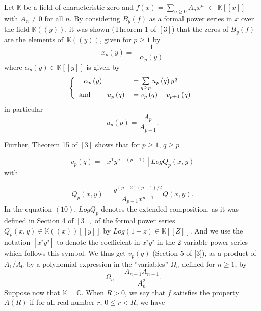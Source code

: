 \documentclass{article}
\begin{document}
Let $\mathbb{K}$ be a field of characteristic zero and $f\left( x\right)
=\sum_{n\geq 0}A_{n}x^{n}$ $\in $ $\mathbb{K}\left[ \left[ x\right] \right] $
with $A_{n}\neq 0$ for all $n$. By considering $B_{y}\left( f\right) $ as a
formal power series in $x$ over the field $\mathbb{K}\left( \left( y\right)
\right) $, it was shown (Theorem 1 of $\left[ 3\right] $) that the zeros of $B_{y}\left( f\right) $ are the elements of\ $\mathbb{K}\left( \left(
y\right) \right) $, given for $p\geq 1$ by 
\begin{equation}
x_{p}\left( y\right) =-\dfrac{1}{\alpha _{p}\left( y\right) }
\end{equation}
where $\alpha _{p}\left( y\right) \in \mathbb{K}\left[ \left[ y\right] \right] $ is given by 
\begin{equation}
\left\{ 
\begin{tabular}{ll}
\ \ $\alpha _{p}\left( y\right) $ & $=\sum\limits_{q\geq p}u_{p}\left(
q\right) y^{q}$ \\ 
and$\text{ \ \ \ \ \ \ }u_{p}\left( q\right) $ & $=v_{p}\left( q\right)
-v_{p+1}\left( q\right) $\end{tabular}
\right. 
\end{equation}
in particular 
\begin{equation}
u_{p}\left( p\right) =\dfrac{A_{p}}{A_{p-1}}.
\end{equation}

Further, Theorem 15 of $\left[ 3\right] $ shows that for $p\geq 1$, $q\geq p$

\begin{equation}
v_{p}\left( q\right) =\left[ x^{1}y^{q-\left( p-1\right) }\right]
LogQ_{p}\left( x,y\right)
\end{equation}
with

\begin{equation*}
Q_{p}\left( x,y\right) =\dfrac{y^{\left( p-2\right) \left( p-1\right) /2}}{A_{p-1}x^{p-1}}Q\left( x,y\right) .
\end{equation*}
In the equation $\left( 10\right) $, $LogQ_{p}$ denotes the extended
composition, as it was defined in Section 4 of $\left[ 3\right] $,\ of the
formal power series $Q_{p}\left( x,y\right) \in \mathbb{K}\left( \left(
x\right) \right) \left[ \left[ y\right] \right] $ by $Log\left( 1+z\right)
\in \mathbb{K}\left[ \left[ Z\right] \right] $. And we use the notation $\left[ x^{i}y^{j}\right] $ to denote the coefficient in $x^{i}y^{j}$ in the
2-variable power series which follows this symbol. We thus get $v_{p}\left(
q\right) $ (Section 5 of [3]), as a product of $A_{1}/A_{0}$ by a polynomial
expression in the ''variables'' $\Omega _{n}$ defined for $n\geq 1$, by 
\begin{equation*}
\;\Omega _{n}=\dfrac{A_{n-1}A_{n+1}}{A_{n}^{2}}\text{.}
\end{equation*}
Suppose now that $\mathbb{K=C}$. When $R>0$, we say that $f$ satisfies the
property $A\left( R\right) $ if for all real number $r$, $0\leq r<R$, we have
\end{document}
